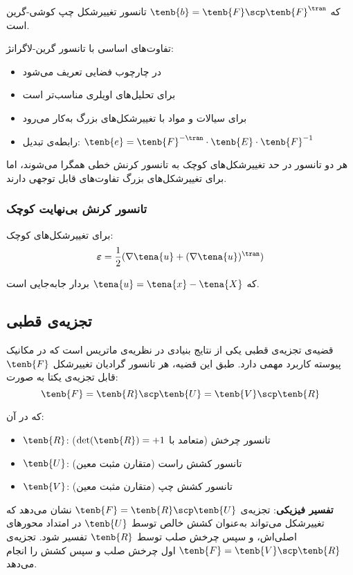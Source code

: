 که $\tenb{b} = \tenb{F} \scp \tenb{F}^\tran$ تانسور تغییرشکل چپ کوشی-گرین است.

تفاوت‌های اساسی با تانسور گرین-لاگرانژ:
\begin{itemize}
	\item در چارچوب فضایی تعریف می‌شود
	\item برای تحلیل‌های اویلری مناسب‌تر است
	\item برای سیالات و مواد با تغییرشکل‌های بزرگ به‌کار می‌رود
	\item رابطه‌ی تبدیل: $\tenb{e} = \tenb{F}^{-\tran} \cdot \tenb{E} \cdot \tenb{F}^{-1}$
\end{itemize}

هر دو تانسور در حد تغییرشکل‌های کوچک به تانسور کرنش خطی همگرا می‌شوند، اما برای تغییرشکل‌های بزرگ تفاوت‌های قابل توجهی دارند.

\subsubsection{تانسور کرنش بی‌نهایت کوچک}
برای تغییرشکل‌های کوچک:
\begin{equation}
	\boldsymbol{\varepsilon} = \frac{1}{2}(\nabla \tena{u} + (\nabla \tena{u})^\tran)
\end{equation}

که $\tena{u} = \tena{x} - \tena{X}$ بردار جابه‌جایی است.

\subsection{تجزیه‌ی قطبی}

قضیه‌ی تجزیه‌ی قطبی یکی از نتایج بنیادی در نظریه‌ی ماتریس است که در مکانیک پیوسته کاربرد مهمی دارد. طبق این قضیه، هر تانسور گرادیان تغییرشکل $\tenb{F}$ قابل تجزیه‌ی یکتا به صورت:
\begin{equation}
	\tenb{F} = \tenb{R} \scp \tenb{U} = \tenb{V} \scp \tenb{R}
\end{equation}

که در آن:
\begin{itemize}
	\item $\tenb{R}$: تانسور چرخش (متعامد با $\det(\tenb{R}) = +1$)
	\item $\tenb{U}$: تانسور کشش راست (متقارن مثبت معین)
	\item $\tenb{V}$: تانسور کشش چپ (متقارن مثبت معین)
\end{itemize}

\textbf{تفسیر فیزیکی}: تجزیه‌ی $\tenb{F} = \tenb{R} \scp \tenb{U}$ نشان می‌دهد که تغییرشکل می‌تواند به‌عنوان کشش خالص توسط $\tenb{U}$ در امتداد محورهای اصلی‌اش، و سپس چرخش صلب توسط $\tenb{R}$ تفسیر شود. تجزیه‌ی $\tenb{F} = \tenb{V} \scp \tenb{R}$ اول چرخش صلب و سپس کشش را انجام می‌دهد.

